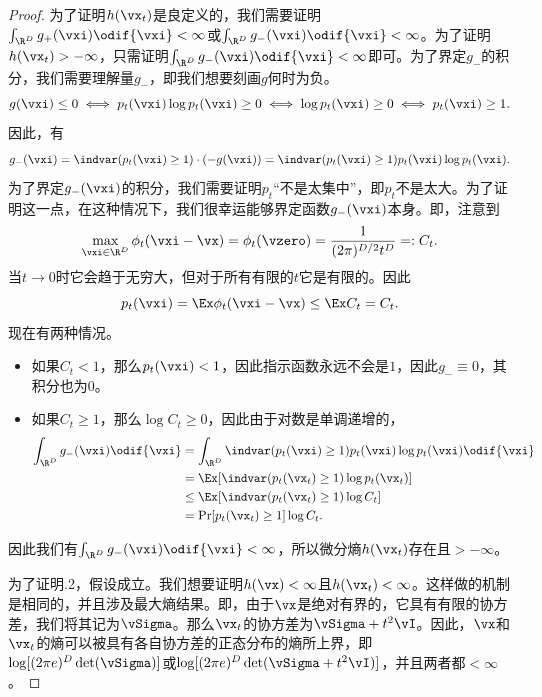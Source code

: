 \documentclass[../../book-main_zh.tex]{subfiles}
\begin{document}
\begin{proof}
    为了证明\(h(\vx_{t})\)是良定义的，我们需要证明\(\int_{\R^{D}}g_{+}(\vxi)\odif{\vxi} < \infty\)或\(\int_{\R^{D}}g_{-}(\vxi) \odif{\vxi} < \infty\)。为了证明\(h(\vx_{t}) > -\infty\)，只需证明\(\int_{\R^{D}}g_{-}(\vxi)\odif{\vxi} < \infty\)即可。为了界定\(g_{-}\)的积分，我们需要理解量\(g_{-}\)，即我们想要刻画\(g\)何时为负。
    \begin{equation}
        g(\vxi) \leq 0 \iff p_{t}(\vxi)\log p_{t}(\vxi) \geq 0 \iff
        \log p_{t}(\vxi) \geq 0 \iff p_{t}(\vxi) \geq 1.
    \end{equation}
    因此，有
    \begin{equation}
        g_{-}(\vxi) = \indvar(p_{t}(\vxi) \geq 1)\cdot (-g(\vxi)) =
        \indvar(p_{t}(\vxi) \geq 1)p_{t}(\vxi)\log p_{t}(\vxi).
    \end{equation}
    为了界定\(g_{-}(\vxi)\)的积分，我们需要证明\(p_{t}\)“不是太集中”，即\(p_{t}\)不是太大。为了证明这一点，在这种情况下，我们很幸运能够界定函数\(g_{-}(\vxi)\)本身。即，注意到
    \begin{equation}
        \max_{\vxi \in \R^{D}}\phi_{t}(\vxi - \vx) = \phi_{t}(\vzero)
        = \frac{1}{(2\pi)^{D/2}t^{D}} =: C_{t}.
    \end{equation}
    当\(t \to 0\)时它会趋于无穷大，但对于所有有限的\(t\)它是有限的。因此
    \begin{equation}
        p_{t}(\vxi) = \Ex \phi_{t}(\vxi - \vx) \leq \Ex C_{t} = C_{t}.
    \end{equation}
    现在有两种情况。
    \begin{itemize}
        \item 如果\(C_{t} < 1\)，那么\(p_{t}(\vxi) < 1\)，因此指示函数永远不会是\(1\)，因此\(g_{-} \equiv 0\)，其积分也为\(0\)。
        \item 如果\(C_{t} \geq 1\)，那么\(\log C_{t} \geq 0\)，因此由于对数是单调递增的，
            \begin{align}
                \int_{\R^{D}}g_{-}(\vxi)\odif{\vxi}
                &= \int_{\R^{D}}\indvar(p_{t}(\vxi) \geq
                1)p_{t}(\vxi)\log p_{t}(\vxi)\odif{\vxi}  \\
                &= \Ex[\indvar(p_{t}(\vx_{t}) \geq 1)\log p_{t}(\vx_{t})]  \\
                &\leq \Ex[\indvar(p_{t}(\vx_{t}) \geq 1) \log C_{t}] \\
                &= \Pr[p_{t}(\vx_{t}) \geq 1]\log C_{t}.
            \end{align}
    \end{itemize}
    因此我们有\(\int_{\R^{D}}g_{-}(\vxi)\odif{\vxi} < \infty\)，所以微分熵\(h(\vx_{t})\)存在且\(> -\infty\)。

    为了证明.2，假设成立。我们想要证明\(h(\vx) < \infty\)且\(h(\vx_{t}) < \infty\)。这样做的机制是相同的，并且涉及最大熵结果。即，由于\(\vx\)是绝对有界的，它具有有限的协方差，我们将其记为\(\vSigma\)。那么\(\vx_{t}\)的协方差为\(\vSigma + t^{2}\vI\)。因此，\(\vx\)和\(\vx_{t}\)的熵可以被具有各自协方差的正态分布的熵所上界，即\(\log[(2\pi e)^{D}\det(\vSigma)]\)或\(\log[(2\pi e)^{D}\det(\vSigma + t^{2}\vI)]\)，并且两者都\(< \infty\)。
\end{proof}
\end{document}
